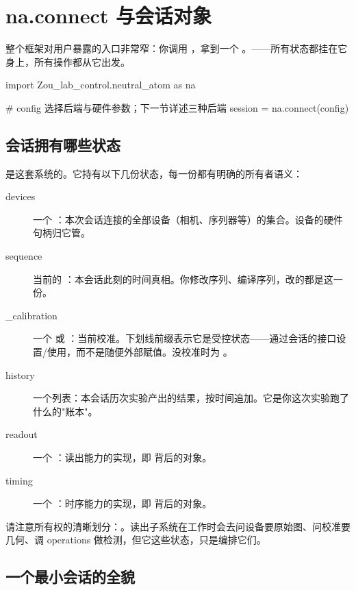 \documentclass[11pt,oneside,openany]{book}
\begin{document}
\section{na.connect 与会话对象}

整个框架对用户暴露的入口非常窄：你调用 ，拿到一个 。——所有状态都挂在它身上，所有操作都从它出发。

\begin{codeblock}[Python]
import Zou_lab_control.neutral_atom as na

# config 选择后端与硬件参数；下一节详述三种后端
session = na.connect(config)
\end{codeblock}

\subsection{会话拥有哪些状态}

 是这套系统的。它持有以下几份状态，每一份都有明确的所有者语义：

\begin{description}
\item[devices] 一个 ：本次会话连接的全部设备（相机、序列器等）的集合。设备的硬件句柄归它管。
\item[sequence] 当前的 ：本会话此刻的时间真相。你修改序列、编译序列，改的都是这一份。
\item[\_calibration] 一个  或 ：当前校准。下划线前缀表示它是受控状态——通过会话的接口设置/使用，而不是随便外部赋值。没校准时为 。
\item[history] 一个列表：本会话历次实验产出的结果，按时间追加。它是你这次实验跑了什么的"账本"。
\item[readout] 一个 ：读出能力的实现，即  背后的对象。
\item[timing] 一个 ：时序能力的实现，即  背后的对象。
\end{description}

请注意所有权的清晰划分：。读出子系统在工作时会去问设备要原始图、问校准要几何、调 operations 做检测，但它这些状态，只是编排它们。

\subsection{一个最小会话的全貌}
\end{document}
